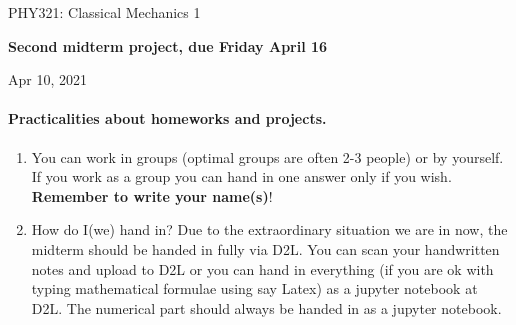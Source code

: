 \documentclass[%
oneside,                 %
final,                   %
10pt]{article}
\begin{document}

\newcommand{\exercisesection}[1]{\subsection*{#1}}






\thispagestyle{empty}

\begin{center}
{\LARGE\bf
\begin{spacing}{1.25}
PHY321: Classical Mechanics 1
\end{spacing}
}
\end{center}


\begin{center}
{\bf Second midterm project, due Friday April 16${}^{}$} \\ [0mm]
\end{center}

\begin{center}
\end{center}
    

\begin{center}
Apr 10, 2021
\end{center}

\vspace{1cm}


\paragraph{Practicalities about  homeworks and projects.}
\begin{enumerate}
\item You can work in groups (optimal groups are often 2-3 people) or by yourself. If you work as a group you can hand in one answer only if you wish. \textbf{Remember to write your name(s)}!

\item How do I(we)  hand in?  Due to the extraordinary situation we are in now, the midterm should be handed in fully via D2L. You can scan your handwritten notes and upload to D2L or you can hand in everything (if you are ok with typing mathematical formulae using say Latex) as a jupyter notebook at D2L. The numerical part should always be handed in as a jupyter notebook.
\end{enumerate}
\end{document}
